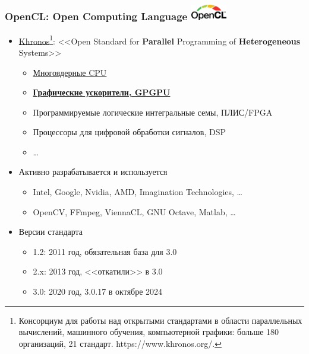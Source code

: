 \documentclass[xcolor=table,aspectratio=169]{beamer}
\begin{document}
\begin{frame}[fragile]
  \frametitle{OpenCL: Open Computing Language \hfill \vspace{-0.1cm}\includegraphics[height=0.7cm]{pictures/OpenCL_CMYK_Apr20.eps}}
  \begin{itemize}
    \item \href{https://www.khronos.org/opencl/}{Khronos\footnote{Консорциум для работы над открытыми стандартами в области параллельных вычислений, машинного обучения, компьютерной графики: больше 180 организаций, 21 стандарт. \url{https://www.khronos.org/}.}}: <<Open Standard for \textbf{Parallel} Programming of \textbf{Heterogeneous} Systems>>
    \begin{itemize}
      \item \underline{Многоядерные CPU}
      \item \underline{\textbf{Графические ускорители, GPGPU}}
      \item Программируемые логические интегральные семы, ПЛИС/FPGA
      \item Процессоры для цифровой обработки сигналов, DSP
      \item \ldots
    \end{itemize}
    \item Активно разрабатывается и используется
    \begin{itemize}
      \item Intel, Google, Nvidia, AMD, Imagination Technologies, \ldots
      \item OpenCV, FFmpeg, ViennaCL, GNU Octave, Matlab, \ldots
    \end{itemize}
  \item Версии стандарта
  \begin{itemize}
    \item 1.2: 2011 год, обязательная база для 3.0
    \item 2.x: 2013 год, <<откатили>> в 3.0
    \item 3.0: 2020 год, 3.0.17 в октябре 2024
  \end{itemize} 
  \end{itemize}
\end{frame}
\end{document}
